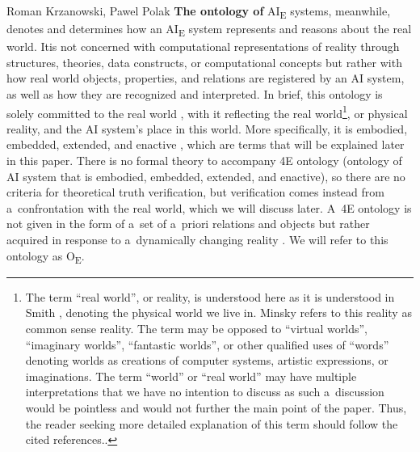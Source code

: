 \begin{artengenv2auth}{Roman Krzanowski, Pawel Polak}
\textbf{The ontology of} AI\textsubscript{E} systems, meanwhile, denotes and determines how an AI\textsubscript{E} system represents and reasons about the real world. Itis not concerned with computational representations of reality through structures, theories, data constructs, or computational concepts but rather with how real world objects, properties, and relations are registered by an AI system, as well as how they are recognized and interpreted. In brief, this ontology is solely committed to the real world
\parencite[in the sense explained by][p.145]{smith_promise_2019}, %
 with it reflecting the real world\footnote{The term ``real world'', or reality, is understood here as it is understood in Smith 
\parencite*[][xiv]{smith_promise_2019}, %
 denoting the physical world we live in. Minsky 
\parencite*[][p.6]{minsky_logical_1991} %
 refers to this reality as common sense reality. The term may be opposed to ``virtual worlds'', ``imaginary worlds'', ``fantastic worlds'', or other qualified uses of ``words'' denoting worlds as creations of computer systems, artistic expressions, or imaginations. The term ``world'' or ``real world'' may have multiple interpretations that we have no intention to discuss as such a~discussion would be pointless and would not further the main point of the paper. Thus, the reader seeking more detailed explanation of this term should follow the cited references..}, or physical reality, and the AI system's place in this world. More specifically, it is embodied, embedded, extended, and enactive 
\parencite[][p.43]{smith_promise_2019}, %
 which are terms that will be explained later in this paper. There is no formal theory to accompany 4E ontology (ontology of AI system that is embodied, embedded, extended, and enactive), so there are no criteria for theoretical truth verification, but verification comes instead from a~confrontation with the real world, which we will discuss later. A~4E ontology is not given in the form of a~set of a~priori relations and objects but rather acquired 
\parencite[][]{smith_promise_2019} %
 in response to a~dynamically changing reality 
\parencites[see][as well as]{minsky_logical_1991}[][]{boltuc_conscious_2020}. %
 We will refer to this ontology as O\textsubscript{E}.


\end{artengenv2auth}
